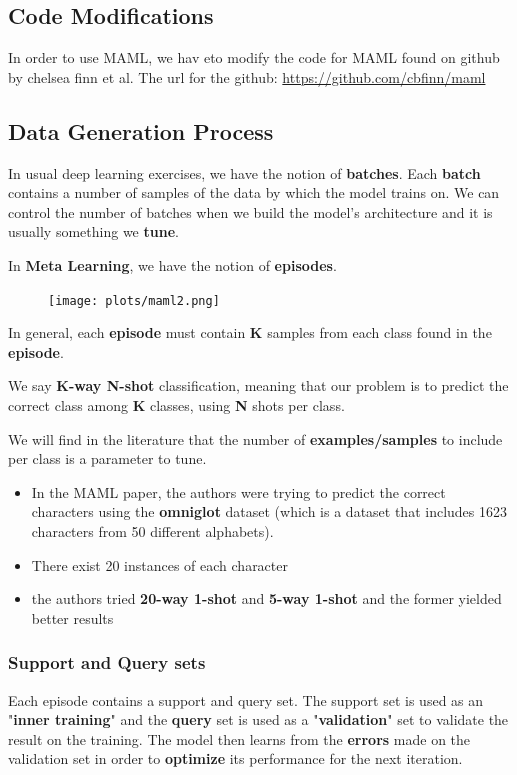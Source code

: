 \documentclass{article}
\begin{document}
\subsection{Code Modifications}
In order to use MAML, we hav eto modify the code for MAML found on github by chelsea finn et al. The url for the github: \url{https://github.com/cbfinn/maml}

\subsection*{Data Generation Process}
In usual deep learning exercises, we have the notion of \textbf{batches}. Each \textbf{batch} contains a number of samples of the data by which the model trains on. We can control the number of batches when we build the model's architecture and it is usually something we \textbf{tune}.

\noindent In \textbf{Meta Learning}, we have the notion of \textbf{episodes}.

\begin{figure}[H]
\centering
\texttt{[image: plots/maml2.png]}
\end{figure}

\noindent In general, each \textbf{episode} must contain \textbf{K} samples from each class found in the \textbf{episode}.

We say \textbf{K-way N-shot} classification, meaning that our problem is to predict the correct class among \textbf{K} classes, using \textbf{N} shots per class.

We will find in the literature that the number of \textbf{examples/samples} to include per class is a parameter to tune.

\begin{itemize}
    \item In the MAML paper, the authors were trying to predict the correct characters using the \textbf{omniglot} dataset (which is a dataset that includes 1623 characters from 50 different alphabets).
    \item There exist 20 instances of each character
    \item the authors tried \textbf{20-way 1-shot} and \textbf{5-way 1-shot} and the former yielded better results
\end{itemize}

\subsubsection*{Support and Query sets}
Each episode contains a support and query set. The support set is used as an "\textbf{inner training}" and the \textbf{query} set is used as a "\textbf{validation}" set to validate the result on the training.  The model then learns from the \textbf{errors} made on the validation set in order to \textbf{optimize} its performance for the next iteration.
\end{document}
